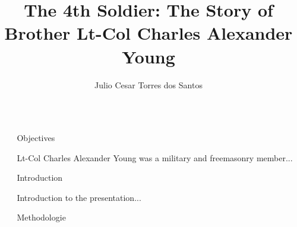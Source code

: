 \documentclass[final]{beamer}
\title{The 4th Soldier: The Story of Brother Lt-Col Charles Alexander Young} %
\author{ Julio Cesar Torres dos Santos} %
\institute{Loge Albion, No.2 - Grand Loge du Québec} %
\newlength{\sepwid}
\newlength{\onecolwid}
\begin{document}
 

\setlength{\belowcaptionskip}{2ex} %
\setlength\belowdisplayshortskip{2ex} %

\begin{frame}[t] %

\begin{columns}[t] %

\begin{column}{\sepwid}\end{column} %

\begin{column}{\onecolwid} %


\begin{alertblock}{Objectives}

Lt-Col Charles Alexander Young was a military and freemasonry member... 

\end{alertblock}


\begin{block}{Introduction}

Introduction to the presentation...

\end{block}



\begin{block}{Methodologie}


\end{block}
\end{column}
\end{columns}
\end{frame}
\end{document}
